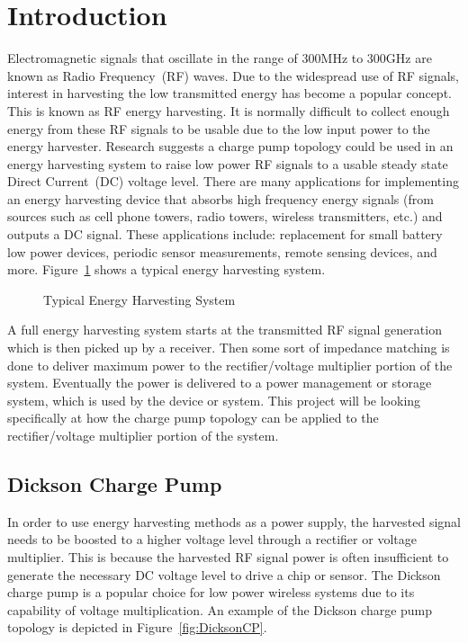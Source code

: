 \documentclass[12pt]{article}
\begin{document}
	\newpage
	\tableofcontents
	\newpage
	
	
\section{Introduction}
Electromagnetic signals that oscillate in the range of 300MHz to 300GHz are known as Radio Frequency~(RF) waves. Due to the widespread use of RF signals, interest in harvesting the low transmitted energy has become a popular concept. This is known as RF energy harvesting. It is normally difficult to collect enough energy from these RF signals to be usable due to the low input power to the energy harvester. Research suggests a charge pump topology could be used in an energy harvesting system to raise low power RF signals to a usable steady state Direct Current~(DC) voltage level. There are many applications for implementing an energy harvesting device that absorbs high frequency energy signals (from sources such as cell phone towers, radio towers, wireless transmitters, etc.) and outputs a DC signal. These applications include: replacement for small battery low power devices, periodic sensor measurements, remote sensing devices, and more. Figure~\ref{fig:energyharvestsystem} shows a typical energy harvesting system.

\begin{figure}[H]
\caption{Typical Energy Harvesting System}
\label{fig:energyharvestsystem}
\end{figure}

\noindent A full energy harvesting system starts at the transmitted RF signal generation which is then picked up by a receiver. Then some sort of impedance matching is done to deliver maximum power to the rectifier/voltage multiplier portion of the system. Eventually the power is delivered to a power management or storage system, which is used by the device or system. This project will be looking specifically at how the charge pump topology can be applied to the rectifier/voltage multiplier portion of the system. 

\subsection{Dickson Charge Pump}
In order to use energy harvesting methods as a power supply, the harvested signal needs to be boosted to a higher voltage level through a rectifier or voltage multiplier. This is because the harvested RF signal power is often insufficient to generate the necessary DC voltage level to drive a chip or sensor. The Dickson charge pump is a popular choice for low power wireless systems due to its capability of voltage multiplication. An example of the Dickson charge pump topology is depicted in Figure~\ref{fig:DicksonCP}.
	
\end{document}
